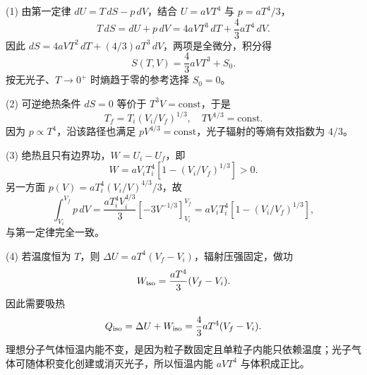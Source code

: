 (1) 由第一定律 \(dU=T\,dS-p\,dV\)，结合 \(U=aVT^4\) 与 \(p=aT^4/3\)，
\[
T\,dS=dU+p\,dV=4aVT^3\,dT+\frac43aT^4\,dV.
\]
因此 \(dS=4aVT^2\,dT+(4/3)aT^3\,dV\)，两项是全微分，积分得
\[
S(T,V)=\frac43aVT^3+S_0.
\]
按无光子、\(T\to0^+\) 时熵趋于零的参考选择 \(S_0=0\)。

(2) 可逆绝热条件 \(dS=0\) 等价于 \(T^3V=\mathrm{const}\)，于是
\[
T_f=T_i(V_i/V_f)^{1/3},\quad TV^{1/3}=\mathrm{const}.
\]
因为 \(p\propto T^4\)，沿该路径也满足 \(pV^{4/3}=\mathrm{const}\)，光子辐射的等熵有效指数为 \(4/3\)。

(3) 绝热且只有边界功，\(W=U_i-U_f\)，即
\[
W=aV_iT_i^4\left[1-(V_i/V_f)^{1/3}\right]>0.
\]
另一方面 \(p(V)=aT_i^4(V_i/V)^{4/3}/3\)，故
\[
\int_{V_i}^{V_f}p\,dV=
\frac{aT_i^4V_i^{4/3}}3
\left[-3V^{-1/3}\right]_{V_i}^{V_f}
=aV_iT_i^4[1-(V_i/V_f)^{1/3}],
\]
与第一定律完全一致。

(4) 若温度恒为 \(T\)，则 \(\Delta U=aT^4(V_f-V_i)\)，辐射压强固定，做功
\[
W_{\rm iso}=\frac{aT^4}{3}(V_f-V_i).
\]
因此需要吸热
\[
Q_{\rm iso}=\Delta U+W_{\rm iso}
=\frac43aT^4(V_f-V_i).
\]
理想分子气体恒温内能不变，是因为粒子数固定且单粒子内能只依赖温度；光子气体可随体积变化创建或消灭光子，所以恒温内能 \(aVT^4\) 与体积成正比。
